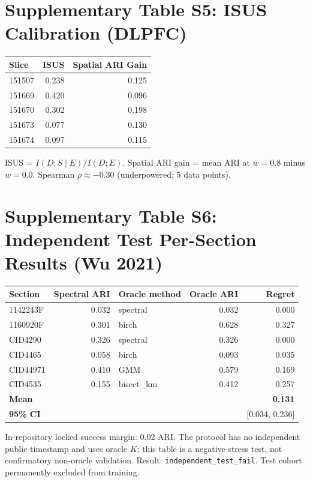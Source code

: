 \documentclass[11pt]{article}
\begin{document}
\section*{Supplementary Table S5: ISUS Calibration (DLPFC)}

\begin{tabular}{@{}lrr@{}}
\toprule
Slice & ISUS & Spatial ARI Gain \\
\midrule
151507 & 0.238 & 0.125 \\
151669 & 0.420 & 0.096 \\
151670 & 0.302 & 0.198 \\
151673 & 0.077 & 0.130 \\
151674 & 0.097 & 0.115 \\
\bottomrule
\end{tabular}

\medskip
\noindent ISUS = $I(D; S \mid E) / I(D; E)$. Spatial ARI gain =
mean ARI at $w=0.8$ minus $w=0.0$. Spearman $\rho \approx -0.30$
(underpowered; 5 data points).

\section*{Supplementary Table S6: Independent Test Per-Section Results
(Wu 2021)}

\begin{tabular}{@{}lrlrr@{}}
\toprule
Section & Spectral ARI & Oracle method & Oracle ARI & Regret \\
\midrule
1142243F & 0.032 & spectral & 0.032 & 0.000 \\
1160920F & 0.301 & birch & 0.628 & 0.327 \\
CID4290 & 0.326 & spectral & 0.326 & 0.000 \\
CID4465 & 0.058 & birch & 0.093 & 0.035 \\
CID44971 & 0.410 & GMM & 0.579 & 0.169 \\
CID4535 & 0.155 & bisect\_km & 0.412 & 0.257 \\
\midrule
\textbf{Mean} & & & & \textbf{0.131} \\
\textbf{95\% CI} & & & & [0.034, 0.236] \\
\bottomrule
\end{tabular}

\medskip
\noindent In-repository locked success margin: 0.02 ARI. The protocol
has no independent public timestamp and uses oracle $K$; this table is a
negative stress test, not confirmatory non-oracle validation.
Result: \texttt{independent\_test\_fail}. Test cohort permanently
excluded from training.
\end{document}

